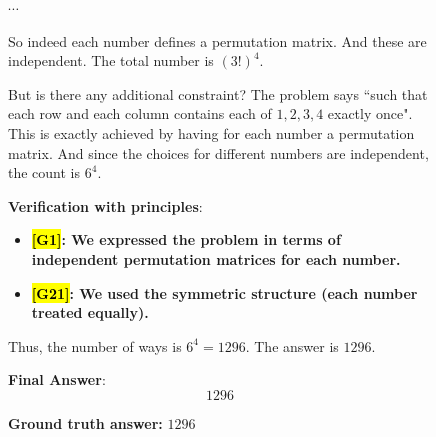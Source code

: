 \documentclass{article}
\theoremstyle{plain}
\theoremstyle{definition}
\theoremstyle{remark}
\begin{document}
\begin{figure}[!tb]
\begin{runcard}[title={Example of How E-SPL Shapes Model Behavior}]
\begin{runbox}[title={Model Output}]
$\cdots$

So indeed each number defines a permutation matrix. And these are independent. The total number is \((3!)^4\).

\medskip

But is there any additional constraint? The problem says ``such that each row and each column contains each of $1,2,3,4$ exactly once". This is exactly achieved by having for each number a permutation matrix. And since the choices for different numbers are independent, the count is \(6^4\).

\medskip

{\color{Brown}\textbf{Verification with principles}}:
\begin{itemize}
    \item \textbf{\color{Brown}\hl{{[G1]}}: We expressed the problem in terms of independent permutation matrices for each number.}
    \item \textbf{\color{Brown}\hl{{[G21]}}: We used the symmetric structure (each number treated equally).}
\end{itemize}

Thus, the number of ways is \(6^4 = 1296\). The answer is \(1296\).

\medskip
\textbf{Final Answer}:
\[
\boxed{1296}
\]

\end{runbox}

\textbf{Ground truth answer:} $1296$
\end{runcard}
\label{tab:example-e-spl-3}

\end{figure}
\end{document}

